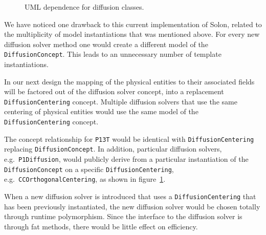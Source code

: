 \documentclass[reqno]{lanl}
\begin{document}
\begin{figure}
\caption{UML dependence for diffusion classes.}
\label{fig:diff_uml}
\end{figure}

We have noticed one drawback to this current implementation of Solon, related
to the multiplicity of model instantiations that was mentioned above.
For every new diffusion solver method one would create a different
model of the \texttt{DiffusionConcept}.
This leads to an unnecessary number of template instantiations.

In our next design the mapping of the physical entities to their associated
fields will be factored out of the diffusion solver concept, into a replacement
\texttt{DiffusionCentering} concept.
Multiple diffusion solvers that use the same centering of physical entities
would use the same model of the \texttt{DiffusionCentering} concept.

The concept relationship for \texttt{P13T} would be identical 
with \texttt{DiffusionCentering} replacing 
\texttt{DiffusionConcept}.
In addition, particular diffusion solvers,
e.g.\ \texttt{P1Diffusion}, would publicly derive from a particular
instantiation of the \texttt{DiffusionConcept} on a
specific \texttt{DiffusionCentering},
e.g.\ \texttt{CCOrthogonalCentering}, as shown in 
figure~\ref{fig:diff_uml}.

When a new diffusion solver is introduced that uses a 
\texttt{DiffusionCentering} that has been previously instantiated,
the new diffusion solver would be chosen
totally through runtime polymorphism.
Since the interface to the diffusion solver is through fat methods,
there would be little effect on efficiency.
\end{document}
